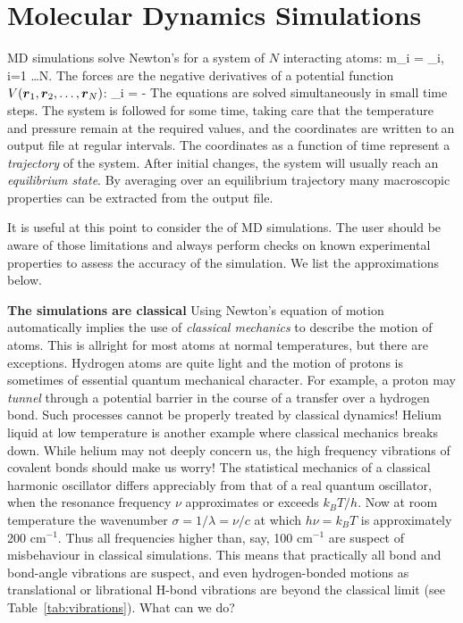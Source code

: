 \section{Molecular Dynamics Simulations}
\label{sec:MDsimulations}
MD simulations solve Newton's  
for a system of $N$ interacting atoms:
\beq
  m_i   = _i, \;i=1 \ldots N.
\eeq
The forces are the negative derivatives of a potential function $V(\mbox{\boldmath ${r}$}_1, 
\mbox{\boldmath ${r}$}_2, \ldots, \mbox{\boldmath ${r}$}_N)$:
\beq
  _i = - 
\eeq
The equations are solved simultaneously in small time steps. The
system is followed for some time, taking care that the temperature and
pressure remain at the required values, and the coordinates are
written to an output file at regular intervals. The coordinates as a
function of time represent a {\em trajectory} of the system. After
initial changes, the system will usually reach an {\em equilibrium
state}. By averaging over an equilibrium trajectory many macroscopic
properties can be extracted from the output file.

It is useful at this point to consider the  of MD
simulations. The user should be aware of those limitations and always
perform checks on known experimental properties to assess the accuracy
of the simulation. We list the approximations below.

{\bf The simulations are classical} Using Newton's equation of motion
automatically implies the use of {\em classical mechanics} to describe
the motion of atoms. This is allright for most atoms at normal
temperatures, but there are exceptions. Hydrogen atoms are quite light
and the motion of protons is sometimes of essential quantum mechanical
character. For example, a proton may {\em tunnel} through a potential
barrier in the course of a transfer over a hydrogen bond. Such
processes cannot be properly treated by classical dynamics! Helium
liquid at low temperature is another example where classical mechanics
breaks down. While helium may not deeply concern us, the high
frequency vibrations of covalent bonds should make us worry! The
statistical mechanics of a classical harmonic oscillator differs
appreciably from that of a real quantum oscillator, when the resonance
frequency $\nu$ approximates or exceeds $k_BT/h$. Now at room
temperature the wavenumber $\sigma = 1/\lambda = \nu/c$ at which $h
\nu = k_BT$ is approximately 200 cm$^{-1}$. Thus all frequencies
higher than, say, 100 cm$^{-1}$ are suspect of misbehaviour in
classical simulations. This means that practically all bond and
bond-angle vibrations are suspect, and even hydrogen-bonded motions as
translational or librational H-bond vibrations are beyond the
classical limit (see Table~\ref{tab:vibrations}). What can we do?

